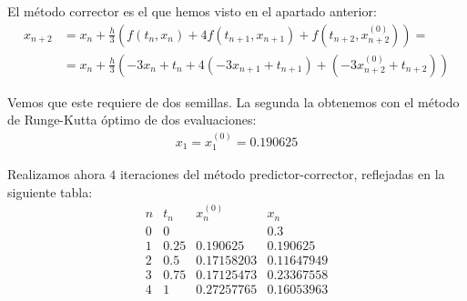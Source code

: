 \begin{ejercicio}
\begin{enumerate}
            El método corrector es el que hemos visto en el apartado anterior:
            \begin{align*}
                x_{n+2} &= x_n + \frac{h}{3} \left( f(t_n, x_n) + 4f(t_{n+1}, x_{n+1}) + f(t_{n+2}, x_{n+2}^{(0)}) \right)
                =\\&= x_n + \frac{h}{3} \left( -3x_n + t_n + 4\left(-3x_{n+1} + t_{n+1}\right) + \left(-3x_{n+2}^{(0)} + t_{n+2}\right) \right)
            \end{align*}

            Vemos que este requiere de dos semillas. La segunda la obtenemos con el método de Runge-Kutta óptimo de dos evaluaciones:
            \begin{align*}
                x_1 = x_1^{(0)} = 0.190625
            \end{align*}

            Realizamos ahora $4$ iteraciones del método predictor-corrector, reflejadas en la siguiente tabla:
            \begin{equation*}
                \begin{array}{c|c|c|c}
                    n & t_n & x_n^{(0)} & x_n \\
                    \hline
                    0 & 0 & & 0.3\\
                    1 & 0.25 & 0.190625 & 0.190625 \\
                    2 & 0.5 & 0.17158203 & 0.11647949 \\
                    3 & 0.75 & 0.17125473 & 0.23367558 \\
                    4 & 1 & 0.27257765 & 0.16053963
                \end{array}
            \end{equation*}


    \end{enumerate}
\end{ejercicio}


